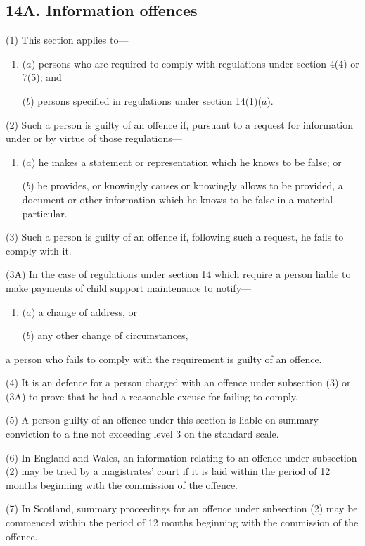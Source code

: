 \documentclass[a4paper]{article}
\begin{document}
\subsection{14A. Information offences}

(1) This section applies to---
\begin{enumerate}\item[]
($a$)
persons who are required to comply with regulations under section 4(4) or
7(5); and

($b$)
persons specified in regulations under section 14(1)($a$).
\end{enumerate}

(2)
Such a person is guilty of an offence if, pursuant to a request for information
under or by virtue of those regulations---
\begin{enumerate}\item[]
($a$)
he makes a statement or representation which he knows to be false; or

($b$)
he provides, or knowingly causes or knowingly allows to be provided, a
document or other information which he knows to be false in a material
particular.
\end{enumerate}

(3)
Such a person is guilty of an offence if, following such a request, he fails to
comply with it.

(3A) In
the case of regulations under section 14 which require a person liable to
make payments of child support maintenance to notify---
\begin{enumerate}\item[]
($a$) a change of address, or

($b$)
any other change of circumstances,
\end{enumerate}
a person who fails to comply with the requirement is guilty of an offence.

(4)
It is an defence for a person charged with an offence under subsection (3) or
(3A) to prove that he had a reasonable excuse for failing to comply.

(5)
A person guilty of an offence under this section is liable on summary conviction
to a fine not exceeding level 3 on the standard scale.

(6) In England and Wales, an information relating to an offence under subsection
(2)
may be tried by a magistrates’ court if it is laid within the period of 12 months
beginning with the commission of the offence.

(7)
In Scotland, summary proceedings for an offence under subsection (2) may be
commenced within the period of 12 months beginning with the commission of the
offence.
\end{document}
